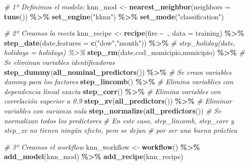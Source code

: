 \documentclass[12pt,a4paper,]{book}
\newenvironment{Shaded}{\begin{snugshade}}{\end{snugshade}}
\newcommand{\AttributeTok}[1]{\textcolor[rgb]{0.13,0.29,0.53}{#1}}
\newcommand{\CommentTok}[1]{\textcolor[rgb]{0.56,0.35,0.01}{\textit{#1}}}
\newcommand{\FunctionTok}[1]{\textcolor[rgb]{0.13,0.29,0.53}{\textbf{#1}}}
\newcommand{\NormalTok}[1]{#1}
\newcommand{\OtherTok}[1]{\textcolor[rgb]{0.56,0.35,0.01}{#1}}
\newcommand{\SpecialCharTok}[1]{\textcolor[rgb]{0.81,0.36,0.00}{\textbf{#1}}}
\newcommand{\StringTok}[1]{\textcolor[rgb]{0.31,0.60,0.02}{#1}}
\newcounter{dummy}
\numberwithin{dummy}{section}
\theoremstyle{ocrenumbox}
\theoremstyle{blacknumex}
\theoremstyle{blacknumbox}
\theoremstyle{ocrenum}
\theoremstyle{ocrenum}
\begin{document}
\begin{Shaded}
\begin{Highlighting}[]
\CommentTok{\# 1º Definimos el modelo:}
\NormalTok{knn\_mod }\OtherTok{\textless{}{-}} 
  \FunctionTok{nearest\_neighbor}\NormalTok{(}\AttributeTok{neighbors =} \FunctionTok{tune}\NormalTok{()) }\SpecialCharTok{\%\textgreater{}\%} 
  \FunctionTok{set\_engine}\NormalTok{(}\StringTok{"kknn"}\NormalTok{) }\SpecialCharTok{\%\textgreater{}\%} 
  \FunctionTok{set\_mode}\NormalTok{(}\StringTok{"classification"}\NormalTok{)  }

\CommentTok{\# 2º Creamos la receta}
\NormalTok{knn\_recipe }\OtherTok{\textless{}{-}} 
  \FunctionTok{recipe}\NormalTok{(fire }\SpecialCharTok{\textasciitilde{}}\NormalTok{ ., }\AttributeTok{data =}\NormalTok{ training) }\SpecialCharTok{\%\textgreater{}\%} 
  \FunctionTok{step\_date}\NormalTok{(date,}\AttributeTok{features =} \FunctionTok{c}\NormalTok{(}\StringTok{"dow"}\NormalTok{,}\StringTok{"month"}\NormalTok{)) }\SpecialCharTok{\%\textgreater{}\%} 
  \CommentTok{\# step\_holiday(date, holidays = holidays) \%\textgreater{}\% }
  \FunctionTok{step\_rm}\NormalTok{(date,cod\_municipio,municipio) }\SpecialCharTok{\%\textgreater{}\%} \CommentTok{\# Se eliminan variables identificadoras}
  \FunctionTok{step\_dummy}\NormalTok{(}\FunctionTok{all\_nominal\_predictors}\NormalTok{()) }\SpecialCharTok{\%\textgreater{}\%} \CommentTok{\# Se crean variables dummy para los factores}
  \FunctionTok{step\_lincomb}\NormalTok{() }\SpecialCharTok{\%\textgreater{}\%} \CommentTok{\# Elimina variablies con dependencia lineal exacta}
  \FunctionTok{step\_corr}\NormalTok{() }\SpecialCharTok{\%\textgreater{}\%} \CommentTok{\# Elimina variables con correlación superior a 0.9}
  \FunctionTok{step\_zv}\NormalTok{(}\FunctionTok{all\_predictors}\NormalTok{()) }\SpecialCharTok{\%\textgreater{}\%} \CommentTok{\# Eliminar variables con varianza nula}
  \FunctionTok{step\_normalize}\NormalTok{(}\FunctionTok{all\_predictors}\NormalTok{()) }\CommentTok{\# Se normalizan todos los predictores}
\CommentTok{\# En este caso, step\_lincomb, step\_corr y step\_zv no tienen ningún efecto, pero se dejan}
\CommentTok{\# por ser una buena práctica}

\CommentTok{\# 3º Creamos el workflow}
\NormalTok{knn\_workflow }\OtherTok{\textless{}{-}} 
  \FunctionTok{workflow}\NormalTok{() }\SpecialCharTok{\%\textgreater{}\%} 
  \FunctionTok{add\_model}\NormalTok{(knn\_mod) }\SpecialCharTok{\%\textgreater{}\%} 
  \FunctionTok{add\_recipe}\NormalTok{(knn\_recipe)}


\end{Highlighting}
\end{Shaded}
\end{document}
